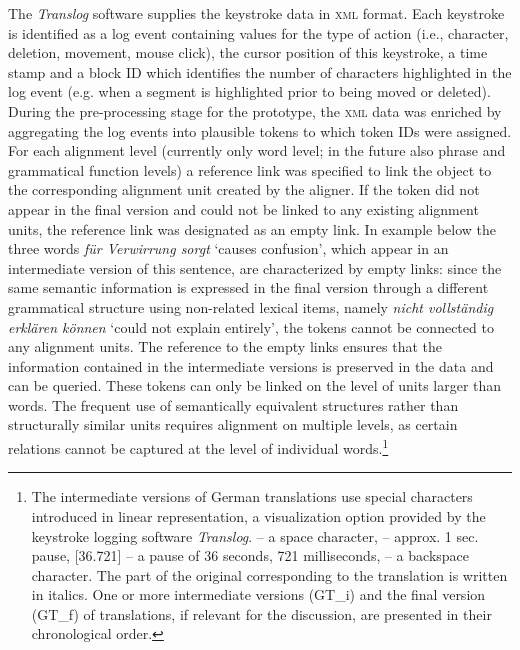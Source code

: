 \documentclass[output=paper]{LSP/langsci}
\begin{document}
The \textit{Translog} software supplies the keystroke data in \textsc{xml} format. Each keystroke is identified as a log event containing values for the type of action (i.e., character, deletion, movement, mouse click), the cursor position of this keystroke, a time stamp and a block ID which identifies the number of characters highlighted in the log event (e.g. when a segment is highlighted prior to being moved or deleted). During the pre-processing stage for the prototype, the \textsc{xml} data was enriched by aggregating the log events into plausible tokens to which token IDs were assigned. For each alignment level (currently only word level; in the future also phrase and grammatical function levels) a reference link was specified to link the object to the corresponding alignment unit created by the aligner. If the token did not appear in the final version and could not be linked to any existing alignment units, the reference link was designated as an empty link. In example  below the three words \textit{für Verwirrung sorgt} `causes confusion', which appear in an intermediate version of this sentence, are characterized by empty links: since the same semantic information is expressed in the final version through a different grammatical structure using non-related lexical items, namely \textit{nicht vollständig erklären können} `could not explain entirely', the tokens cannot be connected to any alignment units. The reference to the empty links ensures that the information contained in the intermediate versions is preserved in the data and can be queried. These tokens can only be linked on the level of units larger than words. The frequent use of semantically equivalent structures rather than structurally similar units requires alignment on multiple levels, as certain relations cannot be captured at the level of individual words.\footnote{The intermediate versions of German translations use special characters introduced in linear representation, a visualization option provided by the keystroke logging software \textit{Translog}. {\raute} -- a space character, {\stern} --  approx. 1 sec. pause, [{\stern}36.721] -- a pause of 36 seconds, 721 milliseconds,{\pfeil} -- a backspace character. The part of the original corresponding to the translation is written in italics. One or more intermediate versions (GT\_i) and the final version (GT\_f) of translations, if relevant for the discussion, are presented in their chronological order.}
\end{document}
